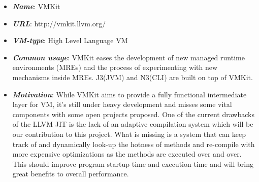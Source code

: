 
\label{sec:related}
\begin{itemize}
 \item  \textbf{\textit{Name}}: VMKit
 \item  \textbf{\textit{URL}}: http://vmkit.llvm.org/
 \item  \textbf{\textit{VM-type}}: High Level Language VM
 \item  \textbf{\textit{Common usage}}: VMKit eases the development of new managed runtime environments (MREs) and the process of experimenting with new mechanisms inside MREs. J3(JVM) and N3(CLI) are built on top of VMKit.
\item  \textbf{\textit{Motivation}}: While VMKit aims to provide a fully functional intermediate layer for VM, it’s still under heavy development and misses some vital components with some open projects proposed. One of the current drawbacks of the LLVM JIT is the lack of an adaptive compilation system which will be our contribution to this project. What is missing is a system that can keep track of and dynamically look-up the hotness of methods and re-compile with more expensive optimizations as the methods are executed over and over. This should improve program startup time and execution time and will bring great benefits to overall performance.
\end{itemize}


